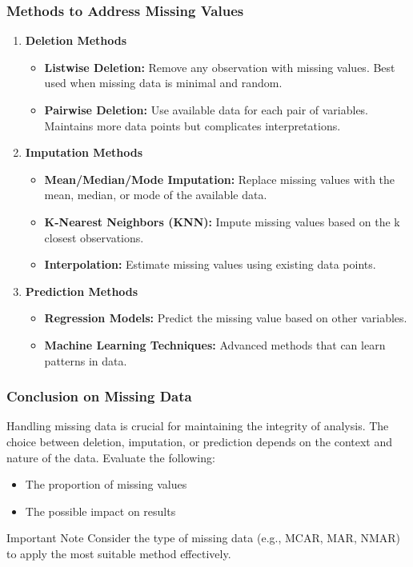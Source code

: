 \documentclass[aspectratio=169]{beamer}
\begin{document}
\begin{frame}[fragile]
    \frametitle{Methods to Address Missing Values}
    \begin{enumerate}
        \item \textbf{Deletion Methods}
        \begin{itemize}
            \item \textbf{Listwise Deletion:} Remove any observation with missing values. Best used when missing data is minimal and random.
            \item \textbf{Pairwise Deletion:} Use available data for each pair of variables. Maintains more data points but complicates interpretations.
        \end{itemize}
        
        \item \textbf{Imputation Methods}
        \begin{itemize}
            \item \textbf{Mean/Median/Mode Imputation:} Replace missing values with the mean, median, or mode of the available data.
            \item \textbf{K-Nearest Neighbors (KNN):} Impute missing values based on the k closest observations.
            \item \textbf{Interpolation:} Estimate missing values using existing data points.
        \end{itemize}
        
        \item \textbf{Prediction Methods}
        \begin{itemize}
            \item \textbf{Regression Models:} Predict the missing value based on other variables.
            \item \textbf{Machine Learning Techniques:} Advanced methods that can learn patterns in data.
        \end{itemize}
    \end{enumerate}
\end{frame}

\begin{frame}[fragile]
    \frametitle{Conclusion on Missing Data}
    Handling missing data is crucial for maintaining the integrity of analysis. The choice between deletion, imputation, or prediction depends on the context and nature of the data. Evaluate the following:
    \begin{itemize}
        \item The proportion of missing values
        \item The possible impact on results
    \end{itemize}
    \begin{block}{Important Note}
        Consider the type of missing data (e.g., MCAR, MAR, NMAR) to apply the most suitable method effectively.
    \end{block}
\end{frame}
\end{document}
